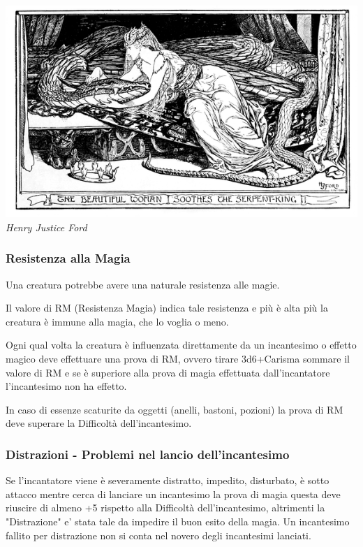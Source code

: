 \begin{multicols}{2}
\medskip

\includegraphics[width=0.9\linewidth]{immagini/donnaserpente.png}
\textit{Henry Justice Ford}

\subsubsection{Resistenza alla Magia}

Una creatura potrebbe avere una naturale resistenza alle magie.

Il valore di RM (Resistenza Magia) indica tale resistenza e più è alta più la creatura è immune alla magia, che lo voglia o meno.

Ogni qual volta la creatura è influenzata direttamente da un incantesimo o effetto magico deve effettuare una prova di RM, ovvero tirare 3d6+Carisma sommare il valore di RM e se è superiore alla prova di magia effettuata dall'incantatore l'incantesimo non ha effetto.

In caso di essenze scaturite da oggetti (anelli, bastoni, pozioni) la prova di RM deve superare la Difficoltà dell'incantesimo.

\subsubsection{Distrazioni - Problemi nel lancio dell'incantesimo}

Se l'incantatore viene è severamente distratto, impedito, disturbato, è sotto attacco mentre cerca di lanciare un incantesimo la prova di magia questa deve riuscire di almeno +5 rispetto alla Difficoltà dell'incantesimo, altrimenti la "Distrazione" e' stata tale da impedire il buon esito della magia.
Un incantesimo fallito per distrazione non si conta nel novero degli incantesimi lanciati.


\end{multicols}
